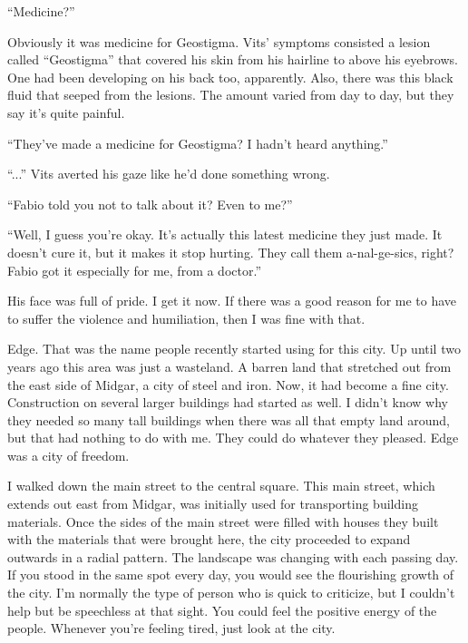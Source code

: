 \documentclass[oneside]{book}
\begin{document}
“Medicine?”

Obviously it was medicine for Geostigma. Vits’ symptoms consisted a lesion called “Geostigma” that covered his skin from his hairline to above his eyebrows. One had been developing on his back too, apparently. Also, there was this black fluid that seeped from the lesions. The amount varied from day to day, but they say it’s quite painful.

“They’ve made a medicine for Geostigma? I hadn’t heard anything.”

“...” Vits averted his gaze like he’d done something wrong.

“Fabio told you not to talk about it? Even to me?”

“Well, I guess you’re okay. It’s actually this latest medicine they just made. It doesn’t cure it, but it makes it stop hurting. They call them a-nal-ge-sics, right? Fabio got it especially for me, from a doctor.”

His face was full of pride. I get it now. If there was a good reason for me to have to suffer the violence and humiliation, then I was fine with that.

Edge. That was the name people recently started using for this city. Up until two years ago this area was just a wasteland. A barren land that stretched out from the east side of Midgar, a city of steel and iron. Now, it had become a fine city. Construction on several larger buildings had started as well. I didn’t know why they needed so many tall buildings when there was all that empty land around, but that had nothing to do with me. They could do whatever they pleased. Edge was a city of freedom.

I walked down the main street to the central square. This main street, which extends out east from Midgar, was initially used for transporting building materials. Once the sides of the main street were filled with houses they built with the materials that were brought here, the city proceeded to expand outwards in a radial pattern. The landscape was changing with each passing day. If you stood in the same spot every day, you would see the flourishing growth of the city. I’m normally the type of person who is quick to criticize, but I couldn’t help but be speechless at that sight. You could feel the positive energy of the people. Whenever you’re feeling tired, just look at the city.
\end{document}
